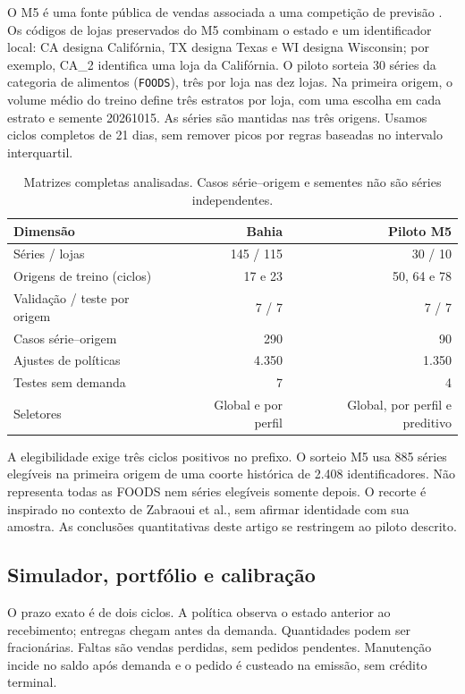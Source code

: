 \documentclass[preprint,12pt]{elsarticle}
\begin{document}
O M5 é uma fonte pública de vendas associada a uma competição de previsão \cite{Makridakis2022M5Accuracy}. Os códigos de lojas preservados do M5 combinam o estado e um identificador local: CA designa Califórnia, TX designa Texas e WI designa Wisconsin; por exemplo, CA\_2 identifica uma loja da Califórnia. O piloto sorteia 30 séries da categoria de alimentos (\texttt{FOODS}), três por loja nas dez lojas. Na primeira origem, o volume médio do treino define três estratos por loja, com uma escolha em cada estrato e semente 20261015. As séries são mantidas nas três origens. Usamos ciclos completos de 21 dias, sem remover picos por regras baseadas no intervalo interquartil.

\begin{table}[htbp]\centering\small
\caption{Matrizes completas analisadas. Casos série--origem e sementes não são séries independentes.}\label{tab:datasets}
\begin{tabular}{@{}lrr@{}}\toprule
Dimensão & Bahia & Piloto M5\\\midrule
Séries / lojas & 145 / 115 & 30 / 10\\
Origens de treino (ciclos) & 17 e 23 & 50, 64 e 78\\
Validação / teste por origem & 7 / 7 & 7 / 7\\
Casos série--origem & 290 & 90\\
Ajustes de políticas & 4.350 & 1.350\\
Testes sem demanda & 7 & 4\\
Seletores & Global e por perfil & Global, por perfil e preditivo\\\bottomrule
\end{tabular}\end{table}

A elegibilidade exige três ciclos positivos no prefixo. O sorteio M5 usa 885 séries elegíveis na primeira origem de uma coorte histórica de 2.408 identificadores. Não representa todas as FOODS nem séries elegíveis somente depois. O recorte é inspirado no contexto de Zabraoui et al., sem afirmar identidade com sua amostra. As conclusões quantitativas deste artigo se restringem ao piloto descrito.

\subsection{Simulador, portfólio e calibração}
O prazo exato é de dois ciclos. A política observa o estado anterior ao recebimento; entregas chegam antes da demanda. Quantidades podem ser fracionárias. Faltas são vendas perdidas, sem pedidos pendentes. Manutenção incide no saldo após demanda e o pedido é custeado na emissão, sem crédito terminal.
\end{document}
